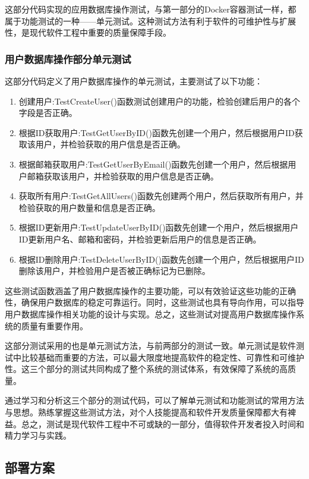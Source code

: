 \documentclass{HDU-Bachelor-Thesis}
\begin{document}
这部分代码实现的应用数据库操作测试，与第一部分的Docker容器测试一样，都属于功能测试的一种——单元测试。这种测试方法有利于软件的可维护性与扩展性，是现代软件工程中重要的质量保障手段。

\subsubsection{用户数据库操作部分单元测试}

这部分代码定义了用户数据库操作的单元测试，主要测试了以下功能：

\begin{enumerate}   
    \item 创建用户:TestCreateUser()函数测试创建用户的功能，检验创建后用户的各个字段是否正确。
    \item 根据ID获取用户:TestGetUserByID()函数先创建一个用户，然后根据用户ID获取该用户，并检验获取的用户信息是否正确。   
    \item 根据邮箱获取用户:TestGetUserByEmail()函数先创建一个用户，然后根据用户邮箱获取该用户，并检验获取的用户信息是否正确。
    \item 获取所有用户:TestGetAllUsers()函数先创建两个用户，然后获取所有用户，并检验获取的用户数量和信息是否正确。
    \item 根据ID更新用户:TestUpdateUserByID()函数先创建一个用户，然后根据用户ID更新用户名、邮箱和密码，并检验更新后用户的信息是否正确。
    \item 根据ID删除用户:TestDeleteUserByID()函数先创建一个用户，然后根据用户ID删除该用户，并检验用户是否被正确标记为已删除。 
\end{enumerate}

这些测试函数涵盖了用户数据库操作的主要功能，可以有效验证这些功能的正确性，确保用户数据库的稳定可靠运行。同时，这些测试也具有导向作用，可以指导用户数据库操作相关功能的设计与实现。总之，这些测试对提高用户数据库操作系统的质量有重要作用。

这部分测试采用的也是单元测试方法，与前两部分的测试一致。单元测试是软件测试中比较基础而重要的方法，可以最大限度地提高软件的稳定性、可靠性和可维护性。这三个部分的测试共同构成了整个系统的测试体系，有效保障了系统的高质量。

通过学习和分析这三个部分的测试代码，可以了解单元测试和功能测试的常用方法与思想。熟练掌握这些测试方法，对个人技能提高和软件开发质量保障都大有裨益。总之，测试是现代软件工程中不可或缺的一部分，值得软件开发者投入时间和精力学习与实践。

\subsection{部署方案}
\end{document}
